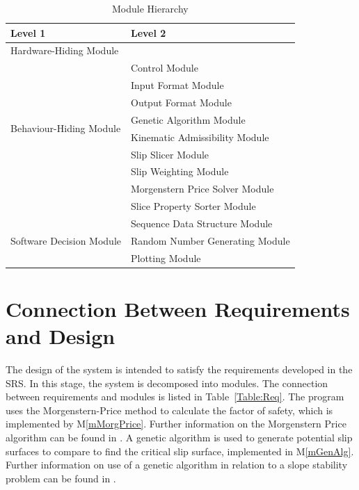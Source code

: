 \documentclass[12pt, titlepage]{article}
\newcommand{\mref}[1]{M\ref{#1}}
\begin{document}
\begin{table}[h!]
\centering
\begin{tabular}{p{} p{} }
\toprule
\textbf{Level 1} & \textbf{Level 2} \\
\midrule

{Hardware-Hiding Module} & ~ \\
\midrule

\multirow{8}{0.3\textwidth}{Behaviour-Hiding Module} &
Control Module \\
& Input Format Module \\
& Output Format Module \\
& Genetic Algorithm Module \\
& Kinematic Admissibility Module \\
& Slip Slicer Module \\
& Slip Weighting Module \\
& Morgenstern Price Solver Module \\
& Slice Property Sorter Module \\
\midrule

\multirow{3}{0.3\textwidth}{Software Decision Module} &
Sequence Data Structure Module \\
& Random Number Generating Module \\
& Plotting Module \\
\bottomrule

\end{tabular}
\caption{Module Hierarchy}
\label{Table:Decomp}
\end{table}

\section{Connection Between Requirements and Design} \label{SecConnection}

\hspace{3ex}The design of the system is intended to satisfy the
requirements developed in the SRS. In this stage, the system is
decomposed into modules. The connection between requirements and
modules is listed in Table~\ref{Table:Req}. The program uses the 
Morgenstern-Price method to calculate the factor of safety, which is implemented
by \mref{mMorgPrice}. Further information on the Morgenstern Price algorithm 
can be found in \cite{ZhuEtAl2005}. A genetic algorithm is used to generate 
potential slip surfaces to compare to find the critical slip surface, 
implemented in \mref{mGenAlg}. Further information on use of a genetic 
algorithm in relation to a slope stability problem can be found in 
\cite{LiEtAl}.
\end{document}
